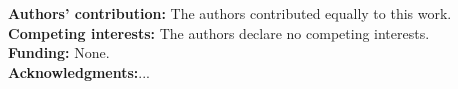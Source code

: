 \documentclass[a4paper, 12pt]{article}
\begin{document}

\newpage
{}








\noindent\small \textbf{Authors' contribution:} The authors contributed equally to this work. \\ 
\noindent\small \textbf{Competing interests:} The authors declare no competing interests.\\
\noindent\small \textbf{Funding:} None.\\
\noindent\small \textbf{Acknowledgments:}...



\nocite{*}           %
\printbibliography 


\end{document}
